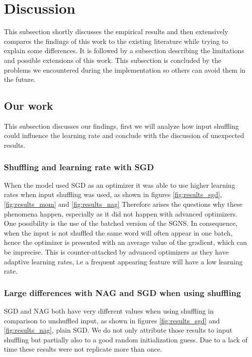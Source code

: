 
\section{Discussion}\label{chap:discussion}

This subsection shortly discusses the empirical results and then extensively compares the findings of this work to the existing literature while trying to explain some differences. It is followed by a subsection describing the limitations and possible extensions of this work. This subsection is concluded by the problems we encountered during the implementation so others can avoid them in the future.

\subsection{Our work}
This subsection discusses our findings, first we will analyze how input shuffling could influence the learning rate and conclude with the discussion of unexpected results.

\subsubsection{Shuffling and learning rate with SGD}
When the model used SGD as an optimizer it was able to use higher learning rates when input shuffling was used, as shown in figures \ref{fig:results_sgd}, \ref{fig:results_mom} and \ref{fig:results_nag} Therefore arises the questions why these phenomena happen, especially as it did not happen with advanced optimizers. One possibility is the use of the batched version of the SGNS. In consequence, when the input is not shuffled the same word will often appear in one batch, hence the optimizer is presented with an average value of the gradient, which can be imprecise. This is counter-attacked by advanced optimizers as they have adaptive learning rates, i.e a frequent appearing feature will have a low learning rate.

\subsubsection{Large differences with NAG and SGD when using shuffling}
SGD and NAG both have very different values when using shuffling in comparison to unshuffled input, as shown in figures \ref{fig:results_sgd} and \ref{fig:results_nag}, plain SGD. We do not only attribute those results to input shuffling but partially also to a good random initialization guess. Due to a lack of time these results were not replicate more than once.

